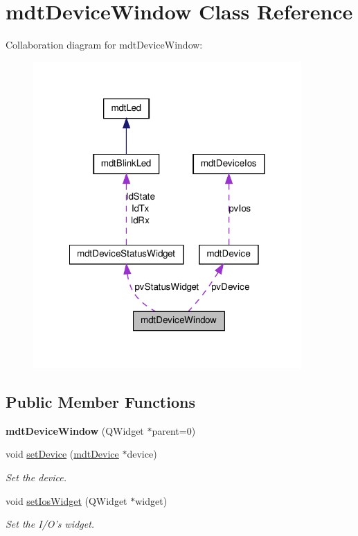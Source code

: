 \hypertarget{classmdt_device_window}{
\section{mdtDeviceWindow Class Reference}
\label{classmdt_device_window}
}


Collaboration diagram for mdtDeviceWindow:
\nopagebreak
\begin{figure}[H]
\begin{center}
\leavevmode
\includegraphics[width=290pt]{classmdt_device_window__coll__graph}
\end{center}
\end{figure}
\subsection*{Public Member Functions}
\begin{DoxyCompactItemize}
\item 
\hypertarget{classmdt_device_window_a92771aaaa091fa653e3c3776b7e115a0}{
{\bfseries mdtDeviceWindow} (QWidget $\ast$parent=0)}
\label{classmdt_device_window_a92771aaaa091fa653e3c3776b7e115a0}

\item 
void \hyperlink{classmdt_device_window_ac3bed35b2eeb88b2483c18e3b9bb918d}{setDevice} (\hyperlink{classmdt_device}{mdtDevice} $\ast$device)
\begin{DoxyCompactList}\small\item\em Set the device. \end{DoxyCompactList}\item 
\hypertarget{classmdt_device_window_a63df49a9f0cafc2f72e097aa0cf26baa}{
void \hyperlink{classmdt_device_window_a63df49a9f0cafc2f72e097aa0cf26baa}{setIosWidget} (QWidget $\ast$widget)}
\label{classmdt_device_window_a63df49a9f0cafc2f72e097aa0cf26baa}

\begin{DoxyCompactList}\small\item\em Set the I/O's widget. \end{DoxyCompactList}\end{DoxyCompactItemize}


